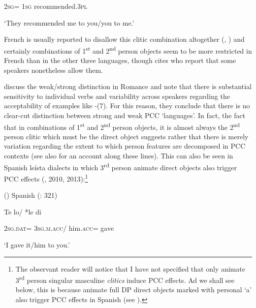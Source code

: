 \documentclass[output=paper,modfonts,nonflat]{langsci/langscibook}
\begin{document}
  \textsc{2sg=}  \textsc{1sg}   recommended.\textsc{3pl}

‘They recommended me to you/you to me.’

French is usually reported to disallow this clitic combination altogether (\citealt{Kayne1975}, \citealt{Quicoli1984}) and certainly combinations of 1\textsuperscript{st} and 2\textsuperscript{nd} person objects seem to be more restricted in French than in the other three languages, though \citet[180]{Bonet1991} cites \citet{SimpsonWithgott1986} who report that some speakers nonetheless allow them. 

\citet{OrmazabalRomero2007} discuss the weak/strong distinction in Romance and note that there is substantial sensitivity to individual verbs and variability across speakers regarding the acceptability of examples like -(7). For this reason, they conclude that there is no clear-cut distinction between strong and weak PCC ‘languages’. In fact, the fact that in combinations of 1\textsuperscript{st} and 2\textsuperscript{nd} person objects, it is almost always the 2\textsuperscript{nd} person clitic which must be the direct object suggests rather that there is merely variation regarding the extent to which person features are decomposed in PCC contexts (see also \citealt{Anagnostopoulou2005} for an account along these lines). This can also be seen in Spanish leísta dialects in which 3\textsuperscript{rd} person animate direct objects also trigger PCC effects (\citealt{OrmazabalRomero2007}, 2010, 2013):\footnote{The observant reader will notice that I have not specified that only animate 3\textsuperscript{rd} person singular masculine \textit{clitics} induce PCC effects. Ad we shall see below, this is because animate full DP direct objects marked with personal ‘a’ also trigger PCC effects in Spanish (see \citealt{OrmazabalRomero2013}).} 

()  Spanish (\citealt{OrmazabalRomero2007}: 321)

Te     lo/    *le     di  

  \textsc{2sg}.\textsc{dat}=  \textsc{3sg.m.acc}/  him.\textsc{acc}=  gave  

  ‘I gave it/him to you.’
\end{document}
